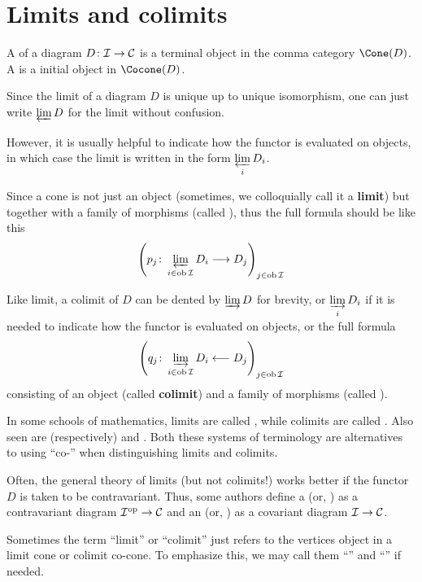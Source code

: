 \newpage\section{Limits and colimits}
\begin{defn}
  A  of a diagram $D\colon {\cal I}\to{\cal C}$ is a terminal object in the comma category $\Cone(D)$.
  A  is a initial object in $\Cocone(D)$.
\end{defn}
\begin{rem}
  Since the limit of a diagram $D$ is unique up to unique isomorphism, one can just write $\operatorname*{\underleftarrow{\lim}} D$ for the limit without confusion.

  However, it is usually helpful to indicate how the functor is evaluated on objects, in which case the limit is written in the form $\operatorname*{\underleftarrow{\lim}}\limits_i D_i$.

  Since a cone is not just an object (sometimes, we colloquially call it a \textbf{limit}) but together with a family of morphisms (called ), thus the full formula should be like this
  \begin{equation*}
    \left(p_j\colon\operatorname*{\underleftarrow{\lim}}_{i\in\operatorname{ob}{\cal I}}D_i \longrightarrow D_j\right)_{j\in\operatorname{ob}{\cal I}}
  \end{equation*}

  Like limit, a colimit of $D$ can be dented by $\operatorname*{\underrightarrow{\lim}} D$ for brevity, or $\operatorname*{\underrightarrow{\lim}}\limits_i D_i$ if it is needed to indicate how the functor is evaluated on objects, or the full formula             
  \begin{equation*}
    \left(q_j\colon\operatorname*{\underrightarrow{\lim}}_{i\in\operatorname{ob}{\cal I}}D_i \longleftarrow D_j\right)_{j\in\operatorname{ob}{\cal I}}
  \end{equation*}
  consisting of an object (called \textbf{colimit}) and a family of morphisms (called ).
\end{rem}
\begin{rem}
  In some schools of mathematics, limits are called , while colimits are called . Also seen are (respectively)  and . Both these systems of terminology are alternatives to using ``co-'' when distinguishing limits and colimits.
\end{rem}
\begin{rem}
  Often, the general theory of limits (but not colimits!) works better if the functor $D$ is taken to be contravariant.
  Thus, some authors define a  (or, ) as a contravariant diagram ${\cal I}^{\operatorname{op}}\to{\cal C}$ and an  (or, ) as a covariant diagram ${\cal I}\to{\cal C}$.
\end{rem}
\begin{rem}
  Sometimes the term ``limit'' or ``colimit'' just refers to the vertices object in a limit cone or colimit co-cone. To emphasize this, we may call them ``'' and ``'' if needed.
\end{rem}

